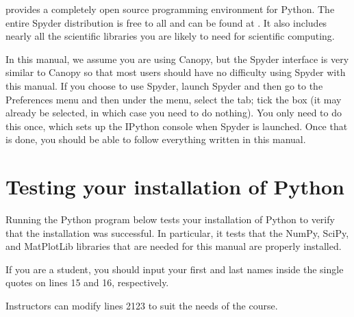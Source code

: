 \documentclass[letterpaper,10pt,english]{sphinxmanual}
\begin{document}
\sphinxAtStartPar
{} provides a completely open source programming environment for Python.  The entire Spyder distribution is free to all and can be found at .  It also includes nearly all the scientific libraries you are likely to need for scientific computing.

\sphinxAtStartPar
In this manual, we assume you are using Canopy, but the Spyder interface is very similar to Canopy so that most users should have no difficulty using Spyder with this manual.  If you choose to use Spyder, launch Spyder and then go to the Preferences menu and then under the  menu, select the  tab; tick the box  (it may already be selected, in which case you need to do nothing).  You only need to do this once, which sets up the IPython console when Spyder is launched.  Once that is done, you should be able to follow everything written in this manual.


\section{Testing your installation of Python}
\label{\detokenize{apdx1/apdx1_install:testing-your-installation-of-python}}
\sphinxAtStartPar
Running the Python program below tests your installation of Python to verify that the installation was successful.  In particular, it tests that the NumPy, SciPy, and MatPlotLib libraries that are needed for this manual are properly installed.

\sphinxAtStartPar
If you are a student, you should input your first and last names inside the single quotes on lines 15 and 16, respectively.

\sphinxAtStartPar
Instructors can modify lines 21\sphinxhyphen{}23 to suit the needs of the course.
\end{document}
